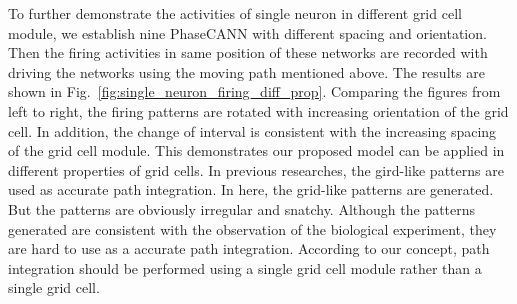 \documentclass[preprint,12pt]{elsarticle}
\begin{document}
To further demonstrate the activities of single neuron in different grid cell module, we establish nine PhaseCANN with different spacing and orientation. Then the firing activities in same position of these networks are recorded with driving the networks using the moving path mentioned above. The results are shown in Fig.~\ref{fig:single_neuron_firing_diff_prop}. Comparing the figures from left to right, the firing patterns are rotated with increasing orientation of the grid cell. In addition, the change of interval is consistent with the increasing spacing of the grid cell module. This demonstrates our proposed model can be applied in different properties of grid cells. In previous researches\cite{Bush2015,Edvardsen2020}, the gird-like patterns are used as accurate path integration. In here, the grid-like patterns are generated. But the patterns are obviously irregular and snatchy. Although the patterns generated are consistent with the observation of the biological experiment\cite{Hafting2005}, they are hard to use as a accurate path integration. According to our concept, path integration should be performed using a single grid cell module rather than a single grid cell.
\end{document}
